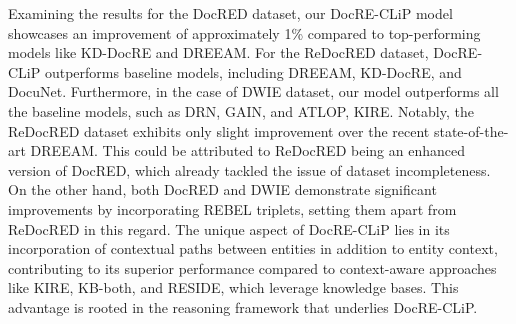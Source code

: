 \documentclass[letterpaper]{article} %
\begin{document}
Examining the results for the DocRED dataset, our DocRE-CLiP model showcases an improvement of approximately 1\% compared to top-performing models like KD-DocRE and DREEAM. For the ReDocRED dataset, DocRE-CLiP outperforms baseline models, including DREEAM, KD-DocRE, and DocuNet. Furthermore, in the case of DWIE dataset, our model outperforms all the baseline models, such as DRN, GAIN, and ATLOP, KIRE. Notably, the ReDocRED dataset exhibits only slight improvement over the recent state-of-the-art DREEAM. This could be attributed to ReDocRED being an enhanced version of DocRED, which already tackled the issue of dataset incompleteness. On the other hand, both DocRED and DWIE demonstrate significant improvements by incorporating REBEL triplets, setting them apart from ReDocRED in this regard.
The unique aspect of DocRE-CLiP lies in its incorporation of contextual paths between entities in addition to entity context, contributing to its superior performance compared to context-aware approaches like KIRE, KB-both, and RESIDE, which leverage knowledge bases. This advantage is rooted in the reasoning framework that underlies DocRE-CLiP.

\end{document}
